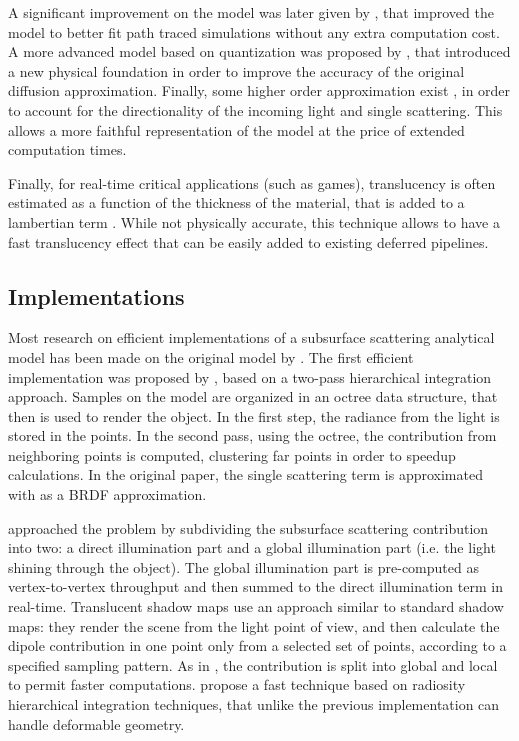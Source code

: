 A significant improvement on the model was later given by \cite{deondeon}, that improved the model to better fit path traced simulations without any extra computation cost. A more advanced model based on quantization was proposed by \cite{D'Eon:2011:QMR:1964921.1964951}, that introduced a new physical foundation in order to improve the accuracy of the original diffusion approximation. Finally, some higher order approximation exist \citep{IMM2013-06646}, in order to account for the directionality of the incoming light and single scattering. This allows a more faithful representation of the model at the price of extended computation times.

Finally, for real-time critical applications (such as games), translucency is often estimated as a function of the thickness of the material, that is added to a lambertian term \citep{Tomaszewska2012}. While not physically accurate, this technique allows to have a fast translucency effect that can be easily added to existing deferred pipelines.

\subsection{Implementations}

Most research on efficient implementations of a subsurface scattering analytical model has been made on the original model by \cite{Jensen:2001:PMS:383259.383319}. The first efficient implementation was proposed by \cite{Jensen:2002:RHR:566654.566619}, based on a two-pass hierarchical integration approach. Samples on the model are organized in an octree data structure, that then is used to render the object. In the first step, the radiance from the light is stored in the points. In the second pass, using the octree, the contribution from neighboring points is computed, clustering far points in order to speedup calculations. In the original paper, the single scattering term is approximated with as a BRDF approximation.

\cite{Lensch:2002:IRT:826030.826632} approached the problem by subdividing the subsurface scattering contribution into two: a direct illumination part and a global illumination part (i.e. the light shining through the object). The global illumination part is pre-computed as vertex-to-vertex throughput and then summed to the direct illumination term in real-time. Translucent shadow maps \citep{Dachsbacher:2003:TSM:882404.882433} use an approach similar to standard shadow maps: they render the scene from the light point of view, and then calculate the dipole contribution in one point only from a selected set of points, according to a specified sampling pattern. As in \cite{Lensch:2002:IRT:826030.826632}, the contribution is split into global and local to permit faster computations. \cite{Mertens:2003:IRT:882404.882423} propose a fast technique based on radiosity hierarchical integration techniques, that unlike the previous implementation can handle deformable geometry.

